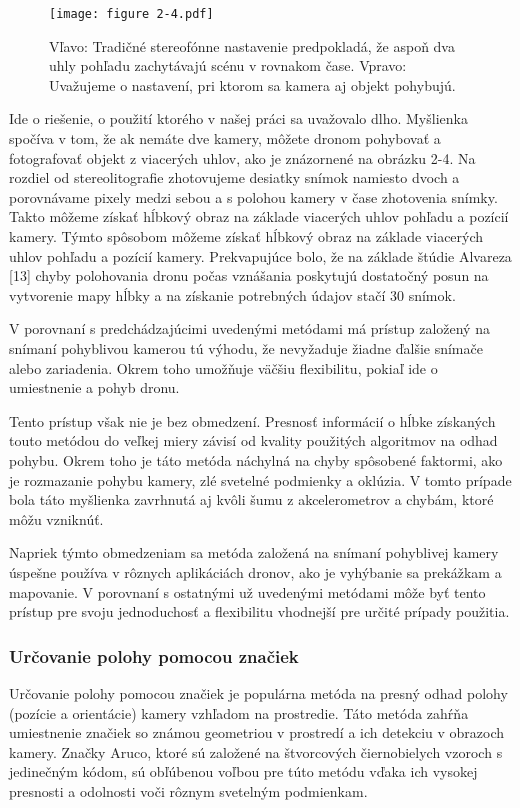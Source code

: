 \begin{figure}[ht!]
    \centering
    \texttt{[image: figure 2-4.pdf]}
    \caption{Vľavo: Tradičné stereofónne nastavenie predpokladá, že aspoň dva uhly pohľadu zachytávajú scénu v rovnakom čase. Vpravo: Uvažujeme o nastavení, pri ktorom sa kamera aj objekt pohybujú.}
    \label{o:2-4}
\end{figure}

Ide o riešenie, o použití ktorého v našej práci sa uvažovalo dlho. Myšlienka spočíva v tom, že ak nemáte dve kamery, môžete dronom pohybovať a fotografovať objekt z viacerých uhlov, ako je znázornené na obrázku 2-4. Na rozdiel od stereolitografie zhotovujeme desiatky snímok namiesto dvoch a porovnávame pixely medzi sebou a s polohou kamery v čase zhotovenia snímky. Takto môžeme získať hĺbkový obraz na základe viacerých uhlov pohľadu a pozícií kamery. Týmto spôsobom môžeme získať hĺbkový obraz na základe viacerých uhlov pohľadu a pozícií kamery. 
Prekvapujúce bolo, že na základe štúdie Alvareza [13] chyby polohovania dronu počas vznášania poskytujú dostatočný posun na vytvorenie mapy hĺbky a na získanie potrebných údajov stačí 30 snímok. 

V porovnaní s predchádzajúcimi uvedenými metódami má prístup založený na snímaní pohyblivou kamerou tú výhodu, že nevyžaduje žiadne ďalšie snímače alebo zariadenia. Okrem toho umožňuje väčšiu flexibilitu, pokiaľ ide o umiestnenie a pohyb dronu.

Tento prístup však nie je bez obmedzení. Presnosť informácií o hĺbke získaných touto metódou do veľkej miery závisí od kvality použitých algoritmov na odhad pohybu. Okrem toho je táto metóda náchylná na chyby spôsobené faktormi, ako je rozmazanie pohybu kamery, zlé svetelné podmienky a oklúzia. V tomto
prípade bola táto myšlienka zavrhnutá aj kvôli šumu z akcelerometrov a chybám,
ktoré môžu vzniknúť.

Napriek týmto obmedzeniam sa metóda založená na snímaní pohyblivej kamery úspešne používa v rôznych aplikáciách dronov, ako je vyhýbanie sa prekážkam a mapovanie. V porovnaní s ostatnými už uvedenými metódami môže byť tento prístup pre svoju jednoduchosť a flexibilitu vhodnejší pre určité prípady použitia.

\subsubsection{Určovanie polohy pomocou značiek}
Určovanie polohy pomocou značiek je populárna metóda na presný odhad polohy (pozície a orientácie) kamery vzhľadom na prostredie. Táto metóda zahŕňa umiestnenie značiek so známou geometriou v prostredí a ich detekciu v obrazoch kamery. Značky Aruco, ktoré sú založené na štvorcových čiernobielych vzoroch s jedinečným kódom, sú obľúbenou voľbou pre túto metódu vďaka ich vysokej presnosti a odolnosti voči rôznym svetelným podmienkam.

